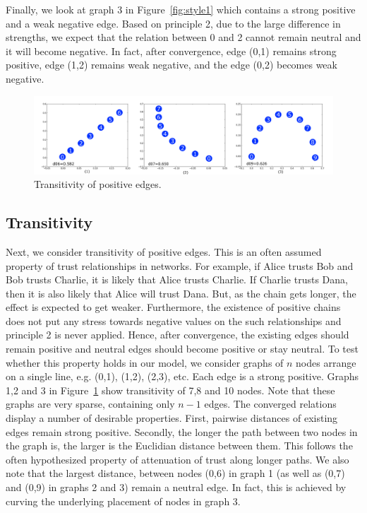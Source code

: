 \documentclass[acmtweb]{acmsmall}
\begin{document}
Finally, we look at graph 3 in Figure~\ref{fig:style1} which contains
a strong positive and a weak negative edge. Based on principle 2, due
to the large difference in strengths, we expect that the relation
between 0 and 2 cannot remain neutral and it will become negative. In
fact, after convergence, edge (0,1) remains strong positive, edge
(1,2) remains weak negative, and the edge (0,2) becomes weak negative.


\begin{figure}[th]
\centering
\includegraphics[width=5.5in]{stylized2.pdf}
\caption{\label{fig:style2} Transitivity of positive edges.}
\end{figure}


\subsection{Transitivity}
Next, we consider transitivity of positive edges. This is an often
assumed property of trust relationships in networks. For example, if
Alice trusts Bob and Bob trusts Charlie, it is likely that Alice
trusts Charlie. If Charlie trusts Dana, then it is also likely that
Alice will trust Dana. But, as the chain gets longer, the effect is
expected to get weaker. Furthermore, the existence of positive chains
does not put any stress towards negative values on the such
relationships and principle 2 is never applied. Hence, after
convergence, the existing edges should remain positive and neutral
edges should become positive or stay neutral.  To test whether this
property holds in our model, we consider graphs of $n$ nodes arrange
on a single line, e.g. (0,1), (1,2), (2,3), etc. Each edge is a strong
positive. Graphs 1,2 and 3 in Figure~\ref{fig:style2} show
transitivity of 7,8 and 10 nodes. Note that these graphs are very
sparse, containing only $n-1$ edges. The converged relations display a
number of desirable properties. First, pairwise distances of existing
edges remain strong positive. Secondly, the longer the path between
two nodes in the graph is, the larger is the Euclidian distance
between them. This follows the often hypothesized property of
attenuation of trust along longer paths. We also note that the largest
distance, between nodes (0,6) in graph 1 (as well as (0,7) and (0,9)
in graphs 2 and 3) remain a neutral edge. In fact, this is achieved by
curving the underlying placement of nodes in graph 3.
\end{document}
